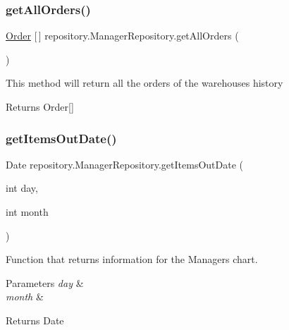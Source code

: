 \subsubsection{\texorpdfstring{get\+All\+Orders()}{getAllOrders()}}
{\footnotesize\ttfamily \mbox{\hyperlink{classentity_1_1_order}{Order}} \mbox{[}$\,$\mbox{]} repository.\+Manager\+Repository.\+get\+All\+Orders (\begin{DoxyParamCaption}{ }\end{DoxyParamCaption})\hspace{0.3cm}{\ttfamily [inline]}}

This method will return all the orders of the warehouse\textquotesingle{}s history \begin{DoxyReturn}{Returns}
Order\mbox{[}\mbox{]} 
\end{DoxyReturn}
\mbox{\label{classrepository_1_1_manager_repository_a674b19911835ed9b14bc4e8ad6bbad95}} 
\subsubsection{\texorpdfstring{get\+Items\+Out\+Date()}{getItemsOutDate()}}
{\footnotesize\ttfamily Date repository.\+Manager\+Repository.\+get\+Items\+Out\+Date (\begin{DoxyParamCaption}\item[{int}]{day,  }\item[{int}]{month }\end{DoxyParamCaption})\hspace{0.3cm}{\ttfamily [inline]}}

Function that returns information for the Manager\textquotesingle{}s chart. 
\begin{DoxyParams}{Parameters}
{\em day} & \\
\hline
{\em month} & \\
\hline
\end{DoxyParams}
\begin{DoxyReturn}{Returns}
Date 
\end{DoxyReturn}
\mbox{\label{classrepository_1_1_manager_repository_a0e915572c7802a1e4503c558cabab270}} 

